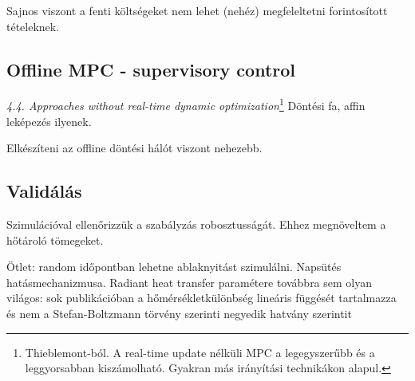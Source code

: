 Sajnos viszont a fenti költségeket nem lehet (nehéz) megfeleltetni forintosított tételeknek.

\hrulefill

\subsection{Offline MPC - supervisory control}

\textit{4.4. Approaches without real-time dynamic optimization}\footnote{Thieblemont-ból. A real-time update nélküli MPC a legegyszerűbb és a leggyorsabban kiszámolható. Gyakran más irányítási technikákon alapul.} Döntési fa, affin leképezés ilyenek.

Elkészíteni az offline döntési hálót viszont nehezebb.


	


\subsection{Validálás}
Szimulációval ellenőrizzük a szabályzás robosztusságát. Ehhez megnöveltem a hőtároló tömegeket.

Ötlet: random időpontban lehetne ablaknyitást szimulálni.
Napsütés hatásmechanizmusa.
Radiant heat transfer paramétere továbbra sem olyan világos: sok publikációban a hőmérsékletkülönbség lineáris függését tartalmazza és nem a Stefan-Boltzmann törvény szerinti negyedik hatvány szerintit